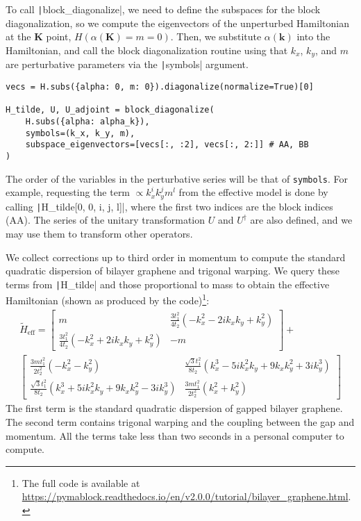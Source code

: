 To call \texttt|block_diagonalize|, we need to define the subspaces for the block diagonalization, so we compute the eigenvectors of the unperturbed Hamiltonian at the $\mathbf{K}$ point, $H(\alpha(\mathbf{K}) = m = 0)$.
Then, we substitute $\alpha(\mathbf{k})$ into the Hamiltonian, and call the block diagonalization routine using that $k_x$, $k_y$, and $m$ are perturbative parameters via the \texttt|symbols| argument.
%
\begin{verbatim}
vecs = H.subs({alpha: 0, m: 0}).diagonalize(normalize=True)[0]

H_tilde, U, U_adjoint = block_diagonalize(
    H.subs({alpha: alpha_k}),
    symbols=(k_x, k_y, m),
    subspace_eigenvectors=[vecs[:, :2], vecs[:, 2:]] # AA, BB
)
\end{verbatim}
%
The order of the variables in the perturbative series will be that of \texttt{symbols}.
For example, requesting the term $\propto k_x^{i} k_y^{j} m^{l}$ from the effective model is done by calling \texttt|H_tilde[0, 0, i, j, l]|, where the first two indices are the block indices (AA).
The series of the unitary transformation $U$ and $U^\dagger$ are also defined, and we may use them to transform other operators.

We collect corrections up to third order in momentum to compute the standard quadratic dispersion of bilayer graphene and trigonal warping.
We query these terms from \texttt|H_tilde| and those proportional to mass to obtain the effective Hamiltonian (shown as produced by the code)\footnote{The full code is available at \url{https://pymablock.readthedocs.io/en/v2.0.0/tutorial/bilayer_graphene.html}.}:
%
{\small
\begin{gather}
\tilde{H}_{\textrm{eff}} =
\begin{bmatrix}
m & \frac{3 t_1^2}{4 t_2} ( - k_x^2 - 2ik_x k_y + k_y^2) \\
\frac{3 t_1^2}{4 t_2} ( - k_x^2 + 2ik_x k_y + k_y^2) & -m
\end{bmatrix} + \nonumber \\
\begin{bmatrix}
\frac{3 m t_1^2}{2 t_2^2} ( - k_x^2 - k_y^2) & \frac{\sqrt{3} t_1^2}{8 t_2} (k_x^3 - 5ik_x^2 k_y + 9 k_x k_y^2 + 3ik_y^3) \\
\frac{\sqrt{3} t_1^2}{8 t_2} (k_x^3 + 5ik_x^2 k_y + 9 k_x k_y^2 - 3ik_y^3) & \frac{3 m t_1^2}{2 t_2^2} (k_x^2 + k_y^2)
\end{bmatrix} \nonumber
\end{gather}
}
%
The first term is the standard quadratic dispersion of gapped bilayer graphene.
The second term contains trigonal warping and the coupling between the gap and momentum.
All the terms take less than two seconds in a personal computer to compute.

